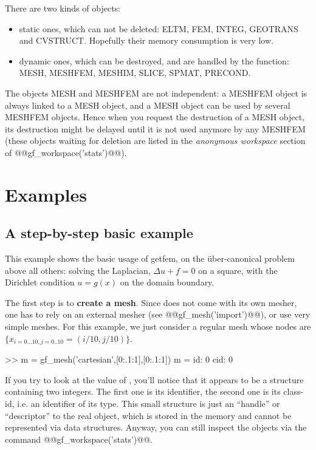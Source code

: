 There are two kinds of \gfm objects:
\begin{itemize}
\item static ones, which can not be deleted: ELTM, FEM, INTEG,
  GEOTRANS and CVSTRUCT. Hopefully their memory consumption is very low.
\item dynamic ones, which can be destroyed, and are handled by the
   function: MESH, MESHFEM, MESHIM, SLICE, SPMAT, PRECOND.
\end{itemize}
The objects MESH and MESHFEM are not independent: a MESHFEM object is
always linked to a MESH object, and a MESH object can be used by
several MESHFEM objects. Hence when you request the destruction of a
MESH object, its destruction might be delayed until it is not used anymore
by any MESHFEM (these objects waiting for deletion are listed in
the \textit{anonymous workspace} section of
@@gf\_workspace('stats')@@).

\section{Examples}
\subsection{A step-by-step basic example}
This example shows the basic usage of getfem, on the {\"u}ber-canonical
problem above all others: solving the Laplacian, $\Delta u+f=0$ on a
square, with the Dirichlet condition $u=g(x)$ on the domain boundary.
\label{laplacianexample}

The first step is to \textbf{create a mesh}. Since \gf does not come with its
own mesher, one has to rely on an external mesher (see
@@gf_mesh('import')@@), or use very simple meshes.  For this example,
we just consider a regular mesh whose nodes are
$\{x_{i=0\ldots10,j=0..10}=(i/10,j/10)\}$.
\begin{matlab}
>> m = gf_mesh('cartesian',[0:.1:1],[0:.1:1])
m =
     id: 0
    cid: 0
\end{matlab}
If you try to look at the value of , you'll notice that it appears to be a structure
containing two integers. The first one is its identifier, the second one is its class-id, i.e. an identifier of its type. This small structure is 
just an ``handle'' or ``descriptor'' to the real object, which is
stored in the \gf memory and cannot be represented via \Mlab data
structures. Anyway, you can still inspect the \gf objects via the
command @@gf\_workspace('stats')@@. 

